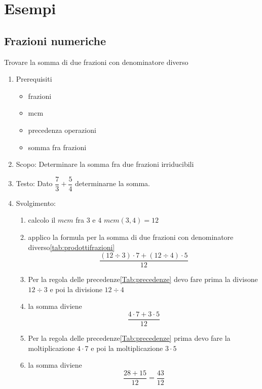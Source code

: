 \chapter{Esempi}
\section{Frazioni numeriche}
\label{sec:Frazioninumeriche}
\begin{table}[H]
	\caption{Trovare la somma di due frazioni con denominatore diverso}
	\label{tab:Trovaresommaduefrazionidenominatorediverso1}
\begin{enumerate}
	\item Prerequisiti 
\begin{itemize}
	\item frazioni
	\item mcm
	 \item precedenza operazioni
 \item somma fra frazioni
\end{itemize}
  \item Scopo: Determinare la somma fra due frazioni irriducibili
  \item Testo: Dato $\dfrac{7}{3}+\dfrac{5}{4}$  determinarne la somma.
  \item Svolgimento: 
  \begin{enumerate}
  \item calcolo il $mcm$ fra $3$ e $4$ $mcm(3,4)=12$
	\item applico la formula per la somma di due frazioni con denominatore diverso\nobs\vref{tab:prodottifrazioni} \[\dfrac{(12\div 3)\cdot 7+(12\div 4)\cdot 5}{12}\]
	\item Per la regola delle precedenze\nobs\vref{Tab:precedenze} devo fare prima la divisone $12\div 3$ e poi la divisione $12\div 4$
	\item la somma diviene \[\dfrac{4\cdot 7+3\cdot 5}{12}\]
	\item Per la regola delle precedenze\nobs\vref{Tab:precedenze} prima devo fare la moltiplicazione $4\cdot 7$ e poi la moltiplicazione $3\cdot 5$
	\item la somma diviene \[\dfrac{28+15}{12}=\dfrac{43}{12}\]
\end{enumerate}
  \end{enumerate}
\end{table}
